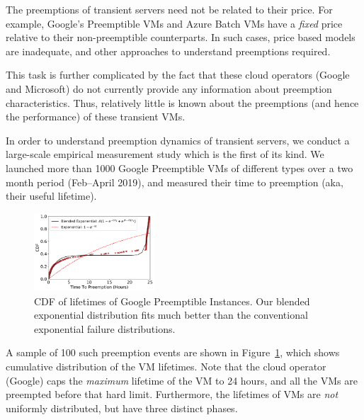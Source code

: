 The preemptions of transient servers need not be related to their price.
For example, Google's Preemptible VMs and Azure Batch VMs have a \emph{fixed} price relative to their non-preemptible counterparts. 
In such cases, price based models are inadequate, and other approaches to understand preemptions  required.

This task is further complicated by the fact that these cloud operators (Google and Microsoft) do not currently provide any information about preemption characteristics. 
Thus, relatively little is known about the preemptions (and hence the performance) of these transient VMs. %

In order to understand preemption dynamics of transient servers, we conduct a large-scale empirical measurement study which is the first of its kind. 
We launched more than 1000 Google Preemptible VMs of different types over a two month period (Feb--April 2019), and measured their time to preemption (aka, their useful lifetime).\footnotemark



\begin{figure}
  \centering
  \includegraphics[width=0.4\textwidth]{../graphs/cdf_4_all.pdf}
  \caption{CDF of lifetimes of Google Preemptible Instances. Our blended exponential distribution fits much better than the conventional exponential failure distributions. }
  \label{fig:gcp1}
\end{figure}

A sample of 100 such preemption events are shown in Figure~\ref{fig:gcp1}, which shows cumulative distribution of the VM lifetimes. 
Note that the cloud operator (Google) caps the \emph{maximum} lifetime of the VM to 24 hours, and all the VMs are preempted before that hard limit.
Furthermore, the lifetimes of VMs are \emph{not} uniformly distributed, but have three distinct phases. 

